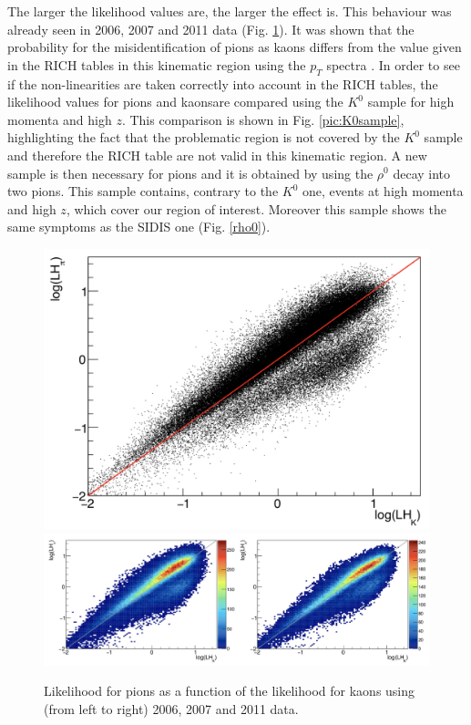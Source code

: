 The larger the likelihood values are, the larger the effect is. This behaviour was already seen in 2006, 2007 and 2011 data (Fig. \ref{pic:NonLinother}). It was shown that the probability for the misidentification of pions as kaons differs from the value given in the RICH tables in this kinematic region using the $p_T$ spectra \cite{Marcin}. In order to see if the non-linearities are taken correctly into account in the RICH tables, the likelihood values for pions and kaonsare compared using the $K^0$ sample for high momenta and high $z$. This comparison is shown in Fig. \ref{pic:K0sample}, highlighting the fact that the problematic region is not covered by the $K^0$ sample and therefore the RICH table are not valid in this kinematic region. A new sample is then necessary for pions and it is obtained by using the $\rho^0$ decay into two pions. This sample contains, contrary to the $K^0$ one, events at high momenta and high $z$, which cover our region of interest. Moreover this sample shows the same symptoms as the SIDIS one (Fig. \ref{rho0}).

\begin{figure}[!h]
  \centering
	\includegraphics[scale=0.2]{./gfx/RICHLH2006.png}
  \includegraphics[scale=0.3]{./gfx/RICHLH2011.png}
	\caption{Likelihood for pions as a function of the likelihood for kaons using (from left to right) 2006, 2007 and 2011 data.}
	\label{pic:NonLinother}
\end{figure}

